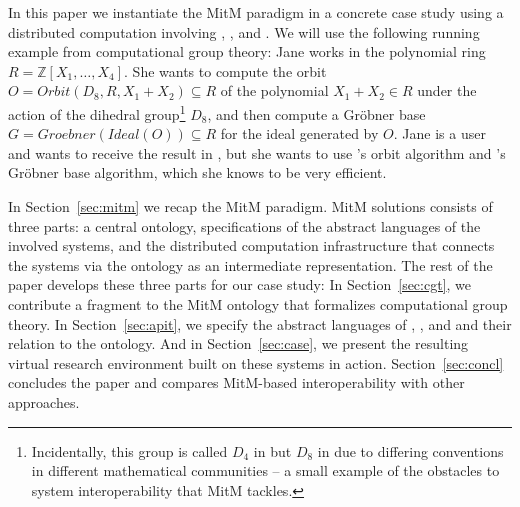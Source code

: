 In this paper we instantiate the MitM paradigm in a concrete case study using a distributed computation involving \GAP, \Sage, and \Singular.
We will use the following running example from computational group theory: Jane works in the polynomial ring $R=\mathbb{Z}[X_1,\ldots,X_4]$.
She wants to compute the orbit $O=Orbit(D_8,R,X_1+X_2)\subseteq R$ of the polynomial $X_1+X_2\in R$ under the action of the dihedral group\footnote{Incidentally, this group is called $D_4$ in \Sage but $D_8$ in \GAP due to differing conventions in different mathematical communities -- a small example of the obstacles to system interoperability that MitM tackles.} $D_8$, and then compute a Gr\"obner base $G=Groebner(Ideal(O))\subseteq R$ for the ideal generated by $O$.
Jane is a \Sage user and wants to receive the result in \Sage, but she wants to use \GAP's orbit algorithm and \Singular's Gr\"obner base algorithm, which she knows to be very efficient.

In Section~\ref{sec:mitm} we recap the MitM paradigm.
MitM solutions consists of three parts: a central ontology, specifications of the abstract languages of the involved systems, and the distributed computation infrastructure that connects the systems via the ontology as an intermediate representation.
The rest of the paper develops these three parts for our case study:
In Section~\ref{sec:cgt}, we contribute a fragment to the MitM ontology that formalizes computational group theory.
In Section~\ref{sec:apit}, we specify the abstract languages of \GAP, \Sage, and \Singular and their relation to the ontology.
And in Section~\ref{sec:case}, we present the resulting virtual research environment built on these systems in action.
Section~\ref{sec:concl} concludes the paper and compares MitM-based interoperability with other approaches.


